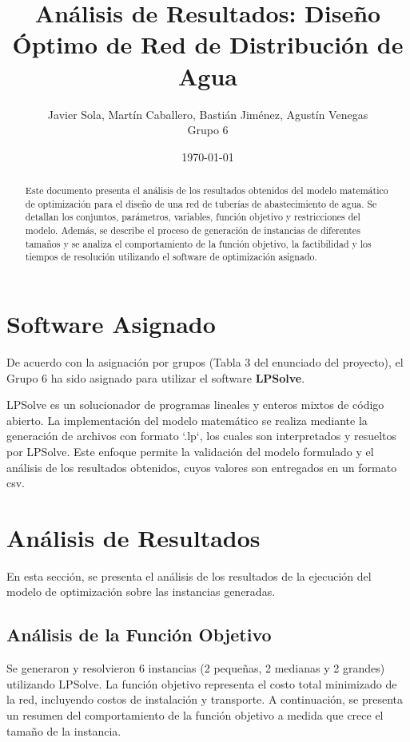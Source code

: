 \documentclass[12pt]{article}
\title{Análisis de Resultados: Diseño Óptimo de Red de Distribución de Agua}
\author{Javier Sola, Martín Caballero, Bastián Jiménez, Agustín Venegas \\ \small Grupo 6}
\date{\today}
\begin{document}
\maketitle

\begin{abstract}
Este documento presenta el análisis de los resultados obtenidos del modelo matemático de optimización para el diseño de una red de tuberías de abastecimiento de agua. Se detallan los conjuntos, parámetros, variables, función objetivo y restricciones del modelo. Además, se describe el proceso de generación de instancias de diferentes tamaños y se analiza el comportamiento de la función objetivo, la factibilidad y los tiempos de resolución utilizando el software de optimización asignado.
\end{abstract}

\clearpage
\tableofcontents
\clearpage

\section{Software Asignado}
De acuerdo con la asignación por grupos (Tabla 3 del enunciado del proyecto), el Grupo 6 ha sido asignado para utilizar el software \textbf{LPSolve}.

LPSolve es un solucionador de programas lineales y enteros mixtos de código abierto. La implementación del modelo matemático se realiza mediante la generación de archivos con formato `.lp`, los cuales son interpretados y resueltos por LPSolve. Este enfoque permite la validación del modelo formulado y el análisis de los resultados obtenidos, cuyos valores son entregados en un formato csv.

\section{Análisis de Resultados}
En esta sección, se presenta el análisis de los resultados de la ejecución del modelo de optimización sobre las instancias generadas.

\subsection{Análisis de la Función Objetivo}
Se generaron y resolvieron 6 instancias (2 pequeñas, 2 medianas y 2 grandes) utilizando LPSolve. La función objetivo representa el costo total minimizado de la red, incluyendo costos de instalación y transporte. A continuación, se presenta un resumen del comportamiento de la función objetivo a medida que crece el tamaño de la instancia.
\end{document}

